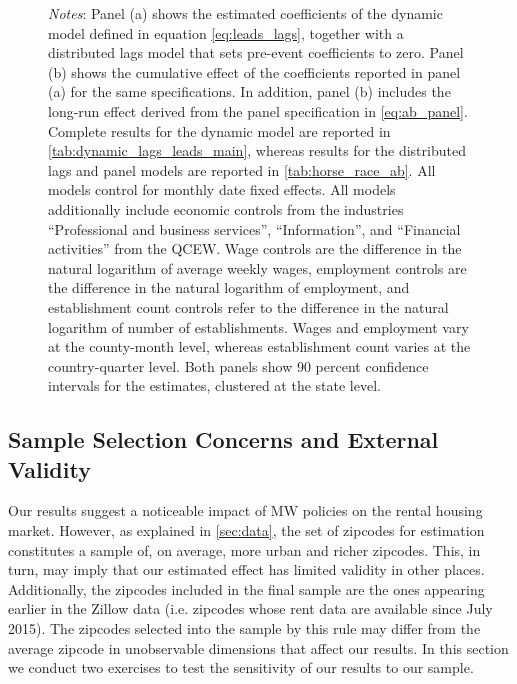 \begin{figure}[htb!]
\begin{minipage}{0.95\textwidth}
		\vspace{2mm} 
		\textit{Notes}: Panel (a) shows the estimated coefficients of the dynamic model defined in 
		equation \autoref{eq:leads_lags}, together with a distributed lags model that sets pre-event 
		coefficients to zero. Panel (b) shows the cumulative effect of the coefficients reported in 
		panel (a) for the same specifications. In addition, panel (b) includes the long-run effect 
		derived from the panel specification in \autoref{eq:ab_panel}. Complete results for the 
		dynamic model are reported in \autoref{tab:dynamic_lags_leads_main}, whereas results for the 
		distributed lags and panel models are reported in \autoref{tab:horse_race_ab}. 
		All models control for monthly date fixed effects. All models additionally  
		include economic controls from the industries ``Professional and business services'', 
		``Information'', and ``Financial activities'' from the QCEW. Wage controls are 
		the difference in the natural logarithm of average weekly wages, employment 
		controls are the difference in the natural logarithm of employment, and 
		establishment count controls refer to the difference in the natural logarithm 
		of number of establishments. Wages and employment vary at the county-month level,
		whereas establishment count varies at the country-quarter level. Both panels
		show 90 percent confidence intervals for the estimates, clustered at the state level. 
	\end{minipage}
\end{figure}


\subsection{Sample Selection Concerns and External Validity}\label{sec:sample_rest}

Our results suggest a noticeable impact of MW policies on the rental housing market. However, as 
explained in \autoref{sec:data}, the set of zipcodes for estimation constitutes a sample of, on 
average, more urban and richer zipcodes. This, in turn, may imply that our estimated effect has 
limited validity in other places. Additionally, the zipcodes included in the final sample are the 
ones appearing earlier in the Zillow data (i.e. zipcodes whose rent data are available since July 
2015). The zipcodes selected into the sample by this rule may differ from the average zipcode 
in unobservable dimensions that affect our results. In this section we conduct two exercises to 
test the sensitivity of our results to our sample.

